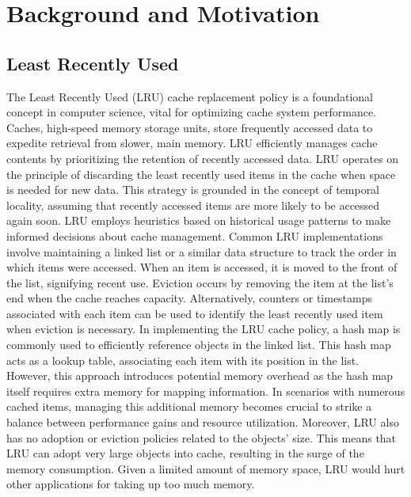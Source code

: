 \documentclass[conference]{IEEEtran}
\begin{document}
\section{Background and Motivation}

\subsection{Least Recently Used}
The Least Recently Used (LRU) cache replacement policy is a foundational concept in computer science, vital for optimizing cache system performance. Caches, high-speed memory storage units, store frequently accessed data to expedite retrieval from slower, main memory. LRU efficiently manages cache contents by prioritizing the retention of recently accessed data.
LRU operates on the principle of discarding the least recently used items in the cache when space is needed for new data. This strategy is grounded in the concept of temporal locality, assuming that recently accessed items are more likely to be accessed again soon. LRU employs heuristics based on historical usage patterns to make informed decisions about cache management.
Common LRU implementations involve maintaining a linked list or a similar data structure to track the order in which items were accessed. When an item is accessed, it is moved to the front of the list, signifying recent use. Eviction occurs by removing the item at the list's end when the cache reaches capacity. Alternatively, counters or timestamps associated with each item can be used to identify the least recently used item when eviction is necessary.
In implementing the LRU cache policy, a hash map is commonly used to efficiently reference objects in the linked list. This hash map acts as a lookup table, associating each item with its position in the list. However, this approach introduces potential memory overhead as the hash map itself requires extra memory for mapping information. In scenarios with numerous cached items, managing this additional memory becomes crucial to strike a balance between performance gains and resource utilization.
Moreover, LRU also has no adoption or eviction policies related to the objects' size. This means that LRU can adopt very large objects into cache, resulting in the surge of the memory consumption. Given a limited amount of memory space, LRU would hurt other applications for taking up too much memory.
\end{document}
